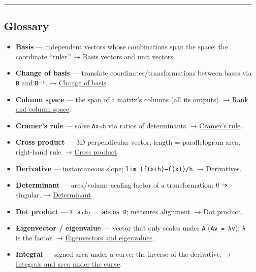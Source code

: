 \documentclass[
  10pt,
  letterpaper,
  onecolumn]{article}
\providecommand{\tightlist}{%
  \setlength{\itemsep}{0pt}\setlength{\parskip}{0pt}}
\begin{document}
\begin{center}\rule{0.5\linewidth}{0.5pt}\end{center}

\hypertarget{glossary}{%
\subsection{Glossary}\label{glossary}}

\begin{itemize}
\tightlist
\item
  \textbf{Basis} --- independent vectors whose combinations span the
  space; the coordinate ``ruler.'' →
  \protect\hyperlink{basis-vectors-and-unit-vectors}{Basis vectors and
  unit vectors}.
\item
  \textbf{Change of basis} --- translate coordinates/transformations
  between bases via \texttt{B} and \texttt{B⁻¹}. →
  \protect\hyperlink{change-of-basis}{Change of basis}.
\item
  \textbf{Column space} --- the span of a matrix's columns (all its
  outputs). → \protect\hyperlink{rank-and-column-space}{Rank and column
  space}.
\item
  \textbf{Cramer's rule} --- solve \texttt{Ax=b} via ratios of
  determinants. → \protect\hyperlink{cramers-rule}{Cramer's rule}.
\item
  \textbf{Cross product} --- 3D perpendicular vector; length =
  parallelogram area; right-hand rule. →
  \protect\hyperlink{cross-product}{Cross product}.
\item
  \textbf{Derivative} --- instantaneous slope;
  \texttt{lim\ (f(x+h)−f(x))/h}. →
  \protect\hyperlink{derivatives}{Derivatives}.
\item
  \textbf{Determinant} --- area/volume scaling factor of a
  transformation; 0 ⇒ singular. →
  \protect\hyperlink{determinant}{Determinant}.
\item
  \textbf{Dot product} ---
  \texttt{Σ\ aᵢbᵢ\ =\ \textbar{}a\textbar{}\textbar{}b\textbar{}cos\ θ};
  measures alignment. → \protect\hyperlink{dot-product}{Dot product}.
\item
  \textbf{Eigenvector / eigenvalue} --- vector that only scales under
  \texttt{A} (\texttt{Av\ =\ λv}); \texttt{λ} is the factor. →
  \protect\hyperlink{eigenvectors-and-eigenvalues}{Eigenvectors and
  eigenvalues}.
\item
  \textbf{Integral} --- signed area under a curve; the inverse of the
  derivative. →
  \protect\hyperlink{integrals-and-area-under-the-curve}{Integrals and
  area under the curve}.

\end{itemize}
\end{document}

